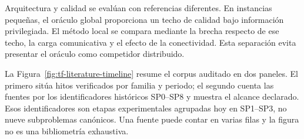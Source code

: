 Arquitectura y calidad se evalúan con referencias diferentes. En instancias pequeñas, el oráculo global proporciona un techo de calidad bajo información privilegiada. El método local se compara mediante la brecha respecto de ese techo, la carga comunicativa y el efecto de la conectividad. Esta separación evita presentar el oráculo como competidor distribuido.

La Figura~\ref{fig:tf-literature-timeline} resume el corpus auditado en dos
paneles. El primero sitúa hitos verificados por familia y periodo; el segundo
cuenta las fuentes por los identificadores históricos SP0--SP8 y muestra el
alcance declarado. Esos identificadores son etapas experimentales agrupadas hoy
en SP1--SP3, no nueve subproblemas canónicos. Una fuente puede contar en varias
filas y la figura no es una bibliometría exhaustiva.

\nocite{zlotStentz2006ComplexTasks}

